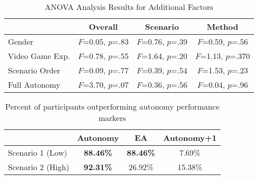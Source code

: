 \begin{table}
\caption{ANOVA Analysis Results for Additional Factors}
	\centering
		\begin{tabular}
			{|l|c|c|c|}
			\hline
			 & Overall & Scenario & Method \\
			\hline
			Gender & $F$=0.05, $p$=.83 & $F$=0.76, $p$=.39 & $F$=0.59, $p$=.56 \\
			\hline
			Video Game Exp. & $F$=0.78, $p$=.55 & $F$=1.64, $p$=.20 & $F$=1.13, $p$=.370 \\
			\hline
			Scenario Order & $F$=0.09, $p$=.77 & $F$=0.39, $p$=.54 & $F$=1.53, $p$=.23 \\
			\hline
			Full Autonomy & $F$=3.70, $p$=.07 & $F$=0.36, $p$=.56 & $F$=0.04, $p$=.96 \\
			\hline			
		\end{tabular}
\label{AOtherFactors}
\end{table}


\begin{table}
\caption{Percent of participants outperforming autonomy performance markers}
	\centering
		\begin{tabular}
			{|l|c|c|c|}
			\hline
			 & Autonomy & EA & Autonomy+1 \\
			\hline
			Scenario 1 (Low) & \textbf{88.46\%} & \textbf{88.46\%} & 7.69\% \\
			\hline
			Scenario 2 (High) & \textbf{92.31\%} & 26.92\% & 15.38\% \\
			\hline			
		\end{tabular}
\label{ACompareToMarkers}
\end{table}
